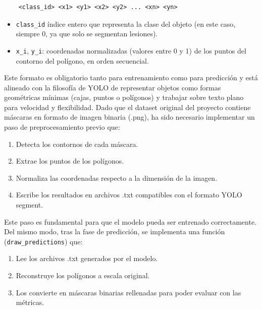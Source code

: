 \documentclass[../main.tex]{subfiles}
\begin{document}
\begin{lstlisting}
    <class_id> <x1> <y1> <x2> <y2> ... <xn> <yn>
\end{lstlisting}

\begin{itemize}
    \item \texttt{class\_id} índice entero que representa la clase del objeto (en este caso, siempre 0, ya que solo se segmentan lesiones).
    \item \texttt{x\_i}, \texttt{y\_i}: coordenadas normalizadas (valores entre 0 y 1) de los puntos del contorno del polígono, en orden secuencial.
\end{itemize}

Este formato es obligatorio tanto para entrenamiento como para predicción y está alineado con la filosofía de YOLO de representar objetos como formas geométricas mínimas (cajas, puntos o polígonos) y trabajar sobre texto plano para velocidad y flexibilidad. Dado que el dataset original del proyecto contiene máscaras en formato de imagen binaria (.png), ha sido necesario implementar un paso de preprocesamiento previo que:

\begin{enumerate}
    \item Detecta los contornos de cada máscara.
    \item Extrae los puntos de los polígonos.
    \item Normaliza las coordenadas respecto a la dimensión de la imagen.
    \item Escribe los resultados en archivos .txt compatibles con el formato YOLO segment.
\end{enumerate}
    
Este paso es fundamental para que el modelo pueda ser entrenado correctamente. Del mismo modo, tras la fase de predicción, se implementa una función (\texttt{draw\_predictions}) que:

\begin{enumerate}
    \item Lee los archivos .txt generados por el modelo.
    \item Reconstruye los polígonos a escala original.
    \item Los convierte en máscaras binarias rellenadas para poder evaluar con las métricas.
\end{enumerate}
\end{document}
